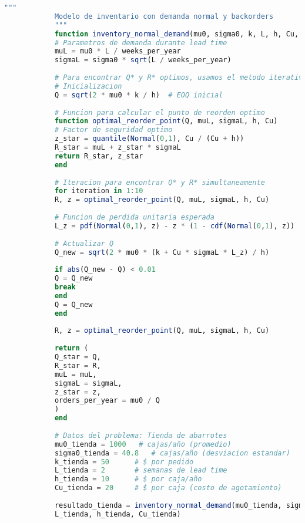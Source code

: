 \documentclass[12pt,a4paper]{book}
\begin{document}
	\begin{tcolorbox}[enhanced,colback=azulclaro,colframe=azulprincipal,boxrule=2pt,arc=8pt,
		title={\bfseries\color{white} \faCode\ DEMANDA NORMAL - TIENDA DE ABARROTES},breakable]
		
		\begin{lstlisting}[language=Julia,basicstyle=\footnotesize\ttfamily]
			"""
			Modelo de inventario con demanda normal y backorders
			"""
			function inventory_normal_demand(mu0, sigma0, k, L, h, Cu, weeks_per_year=52)
			# Parametros de demanda durante lead time
			muL = mu0 * L / weeks_per_year
			sigmaL = sigma0 * sqrt(L / weeks_per_year)
			
			# Para encontrar Q* y R* optimos, usamos el metodo iterativo
			# Inicializacion
			Q = sqrt(2 * mu0 * k / h)  # EOQ inicial
			
			# Funcion para calcular el punto de reorden optimo
			function optimal_reorder_point(Q, muL, sigmaL, h, Cu)
			# Factor de seguridad optimo
			z_star = quantile(Normal(0,1), Cu / (Cu + h))
			R_star = muL + z_star * sigmaL
			return R_star, z_star
			end
			
			# Iteracion para encontrar Q* y R* simultaneamente
			for iteration in 1:10
			R, z = optimal_reorder_point(Q, muL, sigmaL, h, Cu)
			
			# Funcion de perdida unitaria esperada
			L_z = pdf(Normal(0,1), z) - z * (1 - cdf(Normal(0,1), z))
			
			# Actualizar Q
			Q_new = sqrt(2 * mu0 * (k + Cu * sigmaL * L_z) / h)
			
			if abs(Q_new - Q) < 0.01
			Q = Q_new
			break
			end
			Q = Q_new
			end
			
			R, z = optimal_reorder_point(Q, muL, sigmaL, h, Cu)
			
			return (
			Q_star = Q,
			R_star = R,
			muL = muL,
			sigmaL = sigmaL,
			z_star = z,
			orders_per_year = mu0 / Q
			)
			end
			
			# Datos del problema: Tienda de abarrotes
			mu0_tienda = 1000   # cajas/año (promedio)
			sigma0_tienda = 40.8   # cajas/año (desviacion estandar)
			k_tienda = 50      # $ por pedido
			L_tienda = 2       # semanas de lead time
			h_tienda = 10      # $ por caja/año
			Cu_tienda = 20     # $ por caja (costo de agotamiento)
			
			resultado_tienda = inventory_normal_demand(mu0_tienda, sigma0_tienda, k_tienda, 
			L_tienda, h_tienda, Cu_tienda)
			

\end{lstlisting}
\end{tcolorbox}
\end{document}

